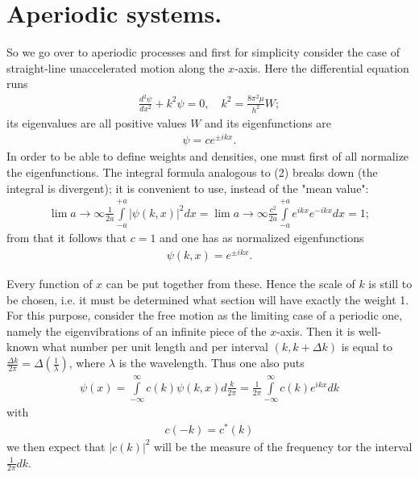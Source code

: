 \documentclass[a4paper,11pt]{article}
\newcommand{\?}[2]{#1\footnote{\textsc{Translator note}: #2}}
\newcommand{\nequ}[2]{\begin{align*}\tag{#1}#2\end{align*}}
\newcommand{\uequ}[1]{\begin{align*}#1\end{align*}}
\renewcommand{\exp}[1]{e^{#1}}
\begin{document}
\section{Aperiodic systems.} So we go over to aperiodic processes and first for simplicity consider the case of straight-line unaccelerated motion along the $x$-axis. Here the differential equation runs
\nequ{1}{
\frac{d^2\psi}{dx^2} + k^2\psi = 0, \quad
k^2 = \frac{8\pi^2\mu}{h^2}W;
}
its eigenvalues are all positive values $W$ and its eigenfunctions are
\uequ{
\psi = c\exp{\pm ikx}.
}
In order to be able to define weights and densities, one must first of all normalize the eigenfunctions. The integral formula analogous to (2) breaks down (the integral is divergent); it is convenient to use, instead of the "mean value":
\nequ{2}{
\lim{a\to\infty}\frac{1}{2a}\int\limits_{-a}^{+a}\left|\psi(k,x)\right|^2 dx =
\lim{a\to\infty}\frac{c^2}{2a}\int\limits_{-a}^{+a}\exp{ikx}\exp{-ikx} dx = 1;
}
from that it follows that $c=1$ and one has as normalized eigenfunctions
\nequ{3}{
\psi(k,x) = \exp{\pm ikx}.
}

Every function of $x$ can be put together from these. Hence the scale of $k$ is still to be chosen, i.e. it must be determined what section will have exactly the weight 1. For this purpose, consider the free motion as the limiting case of a periodic one, namely the eigenvibrations of an infinite piece of the $x$-axis. Then it is well-known what number per unit length and per interval $(k,k+\Delta k)$ is equal to $\frac{\Delta k}{2\pi} = \Delta\left(\frac{1}{\lambda}\right)$, where $\lambda$ is the wavelength. Thus one also puts
\nequ{4}{
\psi(x) = \int\limits_{-\infty}^{\infty} c(k)\psi(k,x)d\frac{k}{2\pi}=
\frac{1}{2\pi}\int\limits_{-\infty}^{\infty}c(k)\exp{ikx}dk
}
with
\nequ{5}{c(-k)=c^*(k)}
we then expect that $|c(k)|^2$ will be the measure of the frequency tor the interval $\frac{1}{2\pi}dk$.
\end{document}

